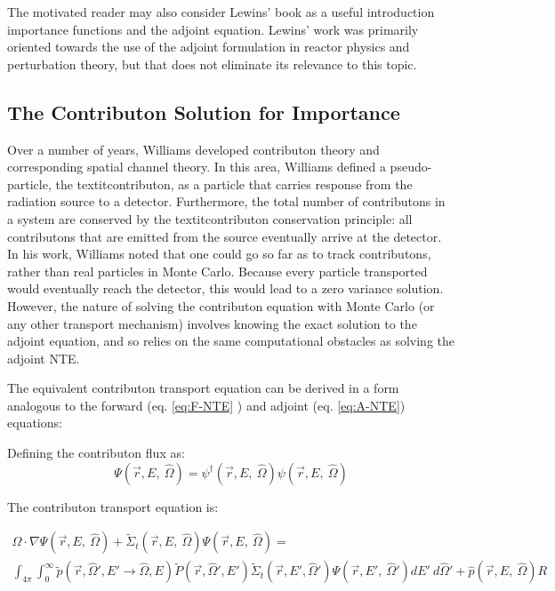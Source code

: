 The motivated reader may also consider Lewins' book
\cite{lewins_importance:_1965} as a
useful introduction importance functions and the adjoint equation. Lewins' work was
primarily oriented towards the use of the adjoint formulation in reactor physics and
perturbation theory, but that does not eliminate its relevance to this topic.


\subsection{The Contributon Solution for Importance}
\label{sec:ContributonImportance}

Over a number of years, Williams
\cite{williams_generalized_1991,williams_contributorn_1992,williams_contributon_study}
developed contributon theory and corresponding spatial channel theory. In this
area, Williams defined a pseudo-particle, the textit{contributon}, as a particle
that carries response from the radiation source to a detector. Furthermore, the
total number of contributons in a system are conserved by the textit{contributon
conservation principle}: all contributons that are emitted from the source
eventually arrive at the detector.  In his work, Williams noted that one could
go so far as to track contributons, rather than real particles in Monte Carlo.
Because every particle transported would eventually reach the detector, this
would lead to a zero variance solution. However, the nature of solving the
contributon equation with Monte Carlo (or any other transport mechanism)
involves knowing the exact solution to the adjoint equation, and so relies on
the same computational obstacles as solving the adjoint NTE.

The equivalent contributon transport equation can be derived in a form analogous
to the forward (eq. \ref{eq:F-NTE} ) and adjoint (eq. \ref{eq:A-NTE}) equations:

Defining the contributon flux as:
\begin{equation}
\Psi (\vec {r} ,E,\:\hat\Omega) = \psi^{\dagger} (\vec {r} ,E,\:\hat\Omega)
        \psi(\vec {r} ,E,\:\hat\Omega)
\label{eq.Cont-Flux}
\end{equation}


The contributon transport equation is:

\begin{multline}
\hat\Omega \cdot \nabla \Psi (\vec {r} ,E,\:\hat\Omega)
+\widetilde{\Sigma} _{ t }(\vec{r},E,\:\hat\Omega)\Psi (\vec { r } ,E,\:\hat\Omega)
     = \\
        \int _{ 4\pi  } \int _{ 0 }^{ \infty  }
        \widetilde{p}(\vec{r}, \hat\Omega', E'\rightarrow\hat\Omega, E)
        \widetilde{P}(\vec{r}, \hat\Omega',E')
        \widetilde{\Sigma} _{ t }(\vec{r}, E', \hat\Omega')
        \Psi (\vec { r } ,E',\: \hat\Omega')dE' \:d\hat\Omega'
        + \hat p(\vec { r } ,E, \:\hat\Omega) R
\label{eq:Cont-NTE}
\end{multline}

